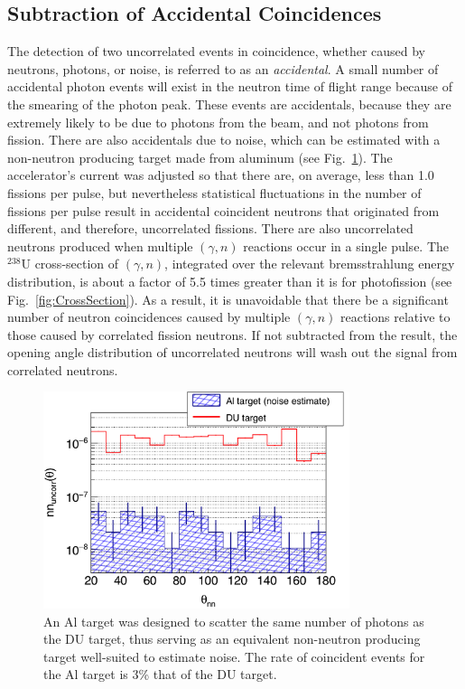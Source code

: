 \subsection{Subtraction of Accidental Coincidences}
\label{Reconstruction of Accidental Coincidence}
The detection of two uncorrelated events in coincidence, whether caused by neutrons, photons, or noise, is referred to as an \emph{accidental}.
A small number of accidental photon events will exist in the neutron time of flight range because of the smearing of the photon peak.
These events are accidentals, because they are extremely likely to be due to photons from the beam, and not photons from fission.
There are also accidentals due to noise, which can be estimated with a non-neutron producing target made from aluminum (see Fig.~\ref{fig:Noise}).
The accelerator's current was adjusted so that there are, on average, less than 1.0 fissions per pulse, but nevertheless statistical fluctuations in the number of fissions per pulse result in accidental coincident neutrons that originated from different, and therefore, uncorrelated fissions.
There are also uncorrelated neutrons produced when multiple $(\gamma, n)$ reactions occur in a single pulse.
The $^{238}$U cross-section of $(\gamma, n)$, integrated over the relevant bremsstrahlung energy distribution, is about a factor of 5.5 times greater than it is for photofission (see Fig.~\ref{fig:CrossSection}).
As a result, it is unavoidable that there be a significant number of neutron coincidences caused by multiple $(\gamma, n)$ reactions relative to those caused by correlated fission neutrons.
If not subtracted from the result, the opening angle distribution of uncorrelated neutrons will wash out the signal from correlated neutrons. 
\begin{figure}[]
\centering
    \includegraphics[width=0.8\textwidth]{Content/Methods/Noise.png}
    \caption{An Al target was designed to scatter the same number of photons as the DU target, thus serving as an equivalent non-neutron producing target well-suited to estimate noise.
    The rate of coincident events for the Al target is 3\% that of the DU target. 
        }
    \label{fig:Noise}
\end{figure}
